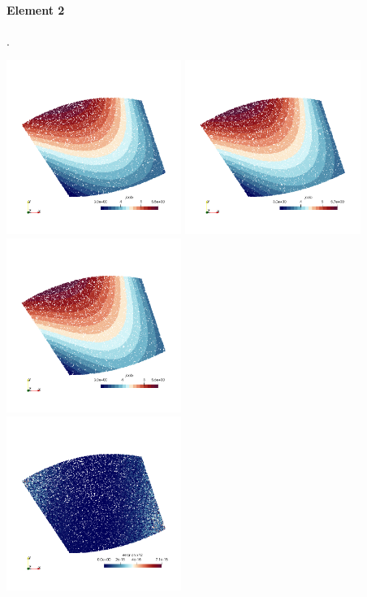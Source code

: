 \paragraph{Element 2} .

\begin{center}
\includegraphics[width=5.7cm]{images/mappings/biquadratic3/elt2/jcob_0}
\includegraphics[width=5.7cm]{images/mappings/biquadratic3/elt2/jcob_1}
\includegraphics[width=5.7cm]{images/mappings/biquadratic3/elt2/jcob_2}\\
\includegraphics[width=5.7cm]{images/mappings/biquadratic3/elt2/error_posx2_0}

\end{center}
